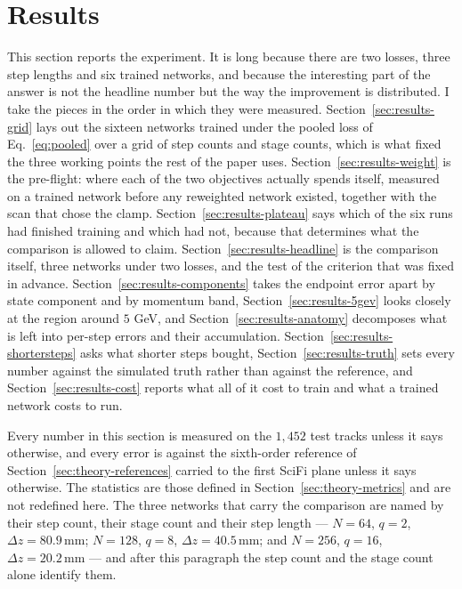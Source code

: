 \documentclass[11pt,a4paper]{article}
\newcommand{\mm}{\ensuremath{\,\mathrm{mm}}}
\begin{document}
\section{Results}
\label{sec:results}

This section reports the experiment. It is long because there are two losses,
three step lengths and six trained networks, and because the interesting part
of the answer is not the headline number but the way the improvement is
distributed. I take the pieces in the order in which they were measured.
Section~\ref{sec:results-grid} lays out the sixteen networks trained under the
pooled loss of Eq.~\eqref{eq:pooled} over a grid of step counts and stage
counts, which is what fixed the three working points the rest of the paper
uses. Section~\ref{sec:results-weight} is the pre-flight: where each of the two
objectives actually spends itself, measured on a trained network before any
reweighted network existed, together with the scan that chose the clamp.
Section~\ref{sec:results-plateau} says which of the six runs had finished
training and which had not, because that determines what the comparison is
allowed to claim. Section~\ref{sec:results-headline} is the comparison itself,
three networks under two losses, and the test of the criterion that was fixed
in advance. Section~\ref{sec:results-components} takes the endpoint error apart
by state component and by momentum band, Section~\ref{sec:results-5gev} looks
closely at the region around $5$ GeV, and
Section~\ref{sec:results-anatomy} decomposes what is left into per-step errors
and their accumulation. Section~\ref{sec:results-shortersteps} asks what
shorter steps bought, Section~\ref{sec:results-truth} sets every number against
the simulated truth rather than against the reference, and
Section~\ref{sec:results-cost} reports what all of it cost to train and what a
trained network costs to run.

Every number in this section is measured on the $1{,}452$ test tracks unless it
says otherwise, and every error is against the sixth-order reference of
Section~\ref{sec:theory-references} carried to the first SciFi plane unless it
says otherwise. The statistics are those defined in
Section~\ref{sec:theory-metrics} and are not redefined here. The three networks
that carry the comparison are named by their step count, their stage count and
their step length --- $N = 64$, $q = 2$, $\Delta z = 80.9\mm$;
$N = 128$, $q = 8$, $\Delta z = 40.5\mm$; and $N = 256$, $q = 16$,
$\Delta z = 20.2\mm$ --- and after this paragraph the step count and the stage
count alone identify them.
\end{document}
